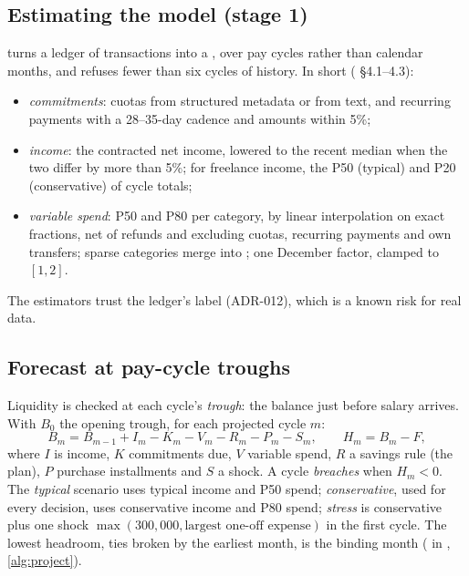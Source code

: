 \subsection{Estimating the model (stage 1)}

 turns a ledger of transactions into a , over pay cycles rather than calendar
months, and refuses fewer than six cycles of history. In short ( \S4.1--4.3):
\begin{itemize}
  \item \emph{commitments}: cuotas from structured metadata or from  text, and recurring payments
    with a 28--35-day cadence and amounts within 5\%;
  \item \emph{income}: the contracted net income, lowered to the recent median when the two differ by more than 5\%;
    for freelance income, the P50 (typical) and P20 (conservative) of cycle totals;
  \item \emph{variable spend}: P50 and P80 per category, by linear interpolation on exact fractions, net of refunds
    and excluding cuotas, recurring payments and own transfers; sparse categories merge into ; one
    December factor, clamped to $[1, 2]$.
\end{itemize}
The estimators trust the ledger's  label (ADR-012), which is a known risk for real data.

\subsection{Forecast at pay-cycle troughs}\label{sec:forecast}

Liquidity is checked at each cycle's \emph{trough}: the balance just before salary arrives. With $B_0$ the opening
trough, for each projected cycle $m$:
\begin{equation}
  B_m = B_{m-1} + I_m - K_m - V_m - R_m - P_m - S_m, \qquad H_m = B_m - F,
\end{equation}
where $I$ is income, $K$ commitments due, $V$ variable spend, $R$ a savings rule (the plan), $P$ purchase installments
and $S$ a shock. A cycle \emph{breaches} when $H_m < 0$. The \emph{typical} scenario uses typical income and P50 spend;
\emph{conservative}, used for every decision, uses conservative income and P80 spend; \emph{stress} is conservative
plus one shock $\max(300{,}000, \text{largest one-off expense})$ in the first cycle. The lowest headroom, ties broken
by the earliest month, is the binding month ( in , \cref{alg:project}).

